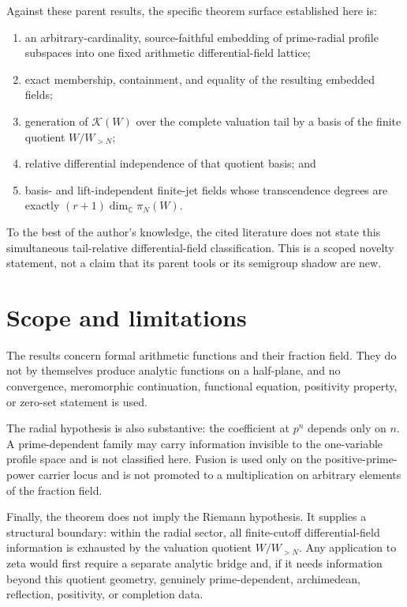 \documentclass[11pt]{article}
\theoremstyle{definition}
\theoremstyle{remark}
\newcommand{\C}{\mathbb C}
\newcommand{\K}{\mathcal K}
\begin{document}
Against these parent results, the specific theorem surface established here is:
\begin{enumerate}
\item an arbitrary-cardinality, source-faithful embedding of prime-radial profile subspaces into
      one fixed arithmetic differential-field lattice;
\item exact membership, containment, and equality of the resulting embedded fields;
\item generation of $\K(W)$ over the complete valuation tail by a basis of the finite quotient
      $W/W_{>N}$;
\item relative differential independence of that quotient basis; and
\item basis- and lift-independent finite-jet fields whose transcendence degrees are exactly
      $(r+1)\dim_\C\pi_N(W)$.
\end{enumerate}
To the best of the author's knowledge, the cited literature does not state this simultaneous
tail-relative differential-field classification.  This is a scoped novelty statement, not a
claim that its parent tools or its semigroup shadow are new.

\section{Scope and limitations}\label{sec:scope}

The results concern formal arithmetic functions and their fraction field.  They do not by
themselves produce analytic functions on a half-plane, and no convergence, meromorphic
continuation, functional equation, positivity property, or zero-set statement is used.

The radial hypothesis is also substantive: the coefficient at $p^n$ depends only on $n$.  A
prime-dependent family may carry information invisible to the one-variable profile space and is
not classified here.  Fusion is used only on the positive-prime-power carrier locus and is not
promoted to a multiplication on arbitrary elements of the fraction field.

Finally, the theorem does not imply the Riemann hypothesis.  It supplies a structural boundary:
within the radial sector, all finite-cutoff differential-field information is exhausted by the
valuation quotient $W/W_{>N}$.  Any application to zeta would first require a separate analytic
bridge and, if it needs information beyond this quotient geometry, genuinely prime-dependent,
archimedean, reflection, positivity, or completion data.
\end{document}
